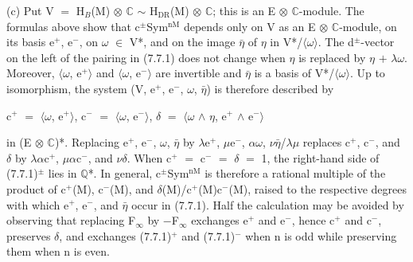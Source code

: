 \documentclass[10pt,twoside]{article}
\begin{document}
(c) Put V \ensuremath{=} H\ensuremath{_{B}}(M) \ensuremath{⊗} \ensuremath{ℂ} \ensuremath{∼} H\ensuremath{_{\mathrm{DR}}}(M) \ensuremath{⊗} \ensuremath{ℂ}; this is an E \ensuremath{⊗} \ensuremath{ℂ}-module. The formulas above show that c\ensuremath{^{±}}Sym\ensuremath{^{\mathrm{nM}}} depends only on V as an E \ensuremath{⊗} \ensuremath{ℂ}-module, on its basis e\ensuremath{^{+}}, e\ensuremath{^{-}}, on \ensuremath{ω} \ensuremath{∈} V*, and on the image \ensuremath{\bar{η}} of \ensuremath{η} in V*/\ensuremath{⟨}\ensuremath{ω}\ensuremath{⟩}. The d\ensuremath{^{±}}-vector on the left of the pairing in (7.7.1) does not change when \ensuremath{η} is replaced by \ensuremath{η} \ensuremath{+} \ensuremath{λ}\ensuremath{ω}. Moreover, \ensuremath{⟨}\ensuremath{ω}, e\ensuremath{^{+}}\ensuremath{⟩} and \ensuremath{⟨}\ensuremath{ω}, e\ensuremath{^{-}}\ensuremath{⟩} are invertible and \ensuremath{\bar{η}} is a basis of V*/\ensuremath{⟨}\ensuremath{ω}\ensuremath{⟩}. Up to isomorphism, the system (V, e\ensuremath{^{+}}, e\ensuremath{^{-}}, \ensuremath{ω}, \ensuremath{\bar{η}}) is therefore described by\par
c\ensuremath{^{+}} \ensuremath{=} \ensuremath{⟨}\ensuremath{ω}, e\ensuremath{^{+}}\ensuremath{⟩},   c\ensuremath{^{-}} \ensuremath{=} \ensuremath{⟨}\ensuremath{ω}, e\ensuremath{^{-}}\ensuremath{⟩},   \ensuremath{δ} \ensuremath{=} \ensuremath{⟨}\ensuremath{ω} \ensuremath{∧} \ensuremath{η}, e\ensuremath{^{+}} \ensuremath{∧} e\ensuremath{^{-}}\ensuremath{⟩}\par
in (E \ensuremath{⊗} \ensuremath{ℂ})*. Replacing e\ensuremath{^{+}}, e\ensuremath{^{-}}, \ensuremath{ω}, \ensuremath{\bar{η}} by \ensuremath{λ}e\ensuremath{^{+}}, \ensuremath{μ}e\ensuremath{^{-}}, \ensuremath{α}\ensuremath{ω}, \ensuremath{ν}\ensuremath{\bar{η}}/\ensuremath{λ}\ensuremath{μ} replaces c\ensuremath{^{+}}, c\ensuremath{^{-}}, and \ensuremath{δ} by \ensuremath{λ}\ensuremath{α}c\ensuremath{^{+}}, \ensuremath{μ}\ensuremath{α}c\ensuremath{^{-}}, and \ensuremath{ν}\ensuremath{δ}. When c\ensuremath{^{+}} \ensuremath{=} c\ensuremath{^{-}} \ensuremath{=} \ensuremath{δ} \ensuremath{=} 1, the right-hand side of (7.7.1)\ensuremath{^{±}} lies in \ensuremath{ℚ}*. In general, c\ensuremath{^{±}}Sym\ensuremath{^{\mathrm{nM}}} is therefore a rational multiple of the product of c\ensuremath{^{+}}(M), c\ensuremath{^{-}}(M), and \ensuremath{δ}(M)/c\ensuremath{^{+}}(M)c\ensuremath{^{-}}(M), raised to the respective degrees with which e\ensuremath{^{+}}, e\ensuremath{^{-}}, and \ensuremath{\bar{η}} occur in (7.7.1). Half the calculation may be avoided by observing that replacing F\ensuremath{_{∞}} by \ensuremath{−}F\ensuremath{_{∞}} exchanges e\ensuremath{^{+}} and e\ensuremath{^{-}}, hence c\ensuremath{^{+}} and c\ensuremath{^{-}}, preserves \ensuremath{δ}, and exchanges (7.7.1)\ensuremath{^{+}} and (7.7.1)\ensuremath{^{−}} when n is odd while preserving them when n is even.\par
\end{document}
